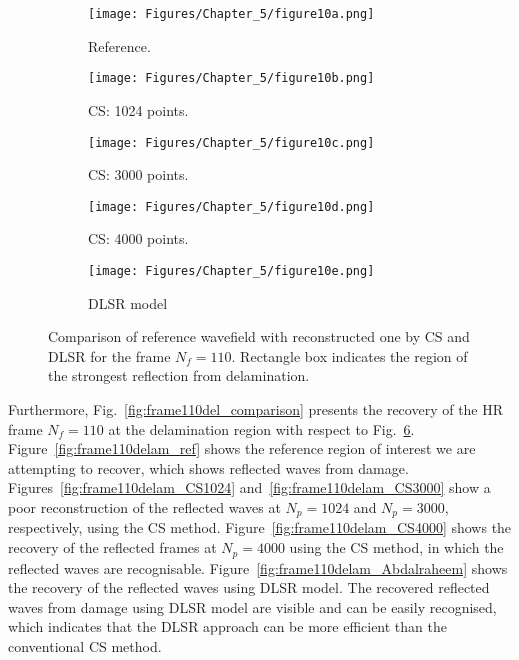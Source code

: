 \begin{figure} [h!]
	\centering
	\begin{subfigure}[b]{0.32\textwidth}
		\centering
		\texttt{[image: Figures/Chapter\_5/figure10a.png]}
		\caption{Reference.}
		\label{fig:frame110_ref}
	\end{subfigure}
	\hfill
	\begin{subfigure}[b]{0.32\textwidth}
		\centering
		\texttt{[image: Figures/Chapter\_5/figure10b.png]}
		\caption{CS: 1024 points.}
		\label{fig:frame110_CS1024}
	\end{subfigure}
	\hfill
	\begin{subfigure}[b]{0.32\textwidth}
		\centering
		\texttt{[image: Figures/Chapter\_5/figure10c.png]}
		\caption{CS: 3000 points.}
		\label{fig:frame110_CS3000}
	\end{subfigure}	
	\hfill
	\begin{subfigure}[b]{0.32\textwidth}
		\centering
		\texttt{[image: Figures/Chapter\_5/figure10d.png]}
		\caption{CS: 4000 points.}
		\label{fig:frame110_CS4000}
	\end{subfigure}
	\begin{subfigure}[b]{0.32\textwidth}
		\centering
		\texttt{[image: Figures/Chapter\_5/figure10e.png]}
		\caption{DLSR model}
		\label{fig:frame110_Abdalraheem}
	\end{subfigure}
	\caption{Comparison of reference wavefield with reconstructed one by CS and DLSR for the frame $N_f = 110$. Rectangle box indicates the region of the strongest reflection from delamination.}
	\label{fig:frame110_comparison}
\end{figure}

Furthermore, Fig.~\ref{fig:frame110del_comparison} presents the recovery of the HR frame $N_f=110$ at the delamination region with respect to Fig.~\ref{fig:frame110_comparison}.
Figure~\ref{fig:frame110delam_ref} shows the reference region of interest we are attempting to recover, which shows reflected waves from damage.
Figures~\ref{fig:frame110delam_CS1024} and~\ref{fig:frame110delam_CS3000} show a poor reconstruction of the reflected waves at $N_p=1024$ and $N_p=3000$, respectively, using the CS method.
Figure~\ref{fig:frame110delam_CS4000} shows the recovery of the reflected frames at $N_p=4000$ using the CS method, in which the reflected waves are recognisable.
Figure~\ref{fig:frame110delam_Abdalraheem} shows the recovery of the reflected waves using DLSR model.
The recovered reflected waves from damage using DLSR model are visible and can be easily recognised, which indicates that the DLSR approach can be more efficient than the conventional CS method. 


